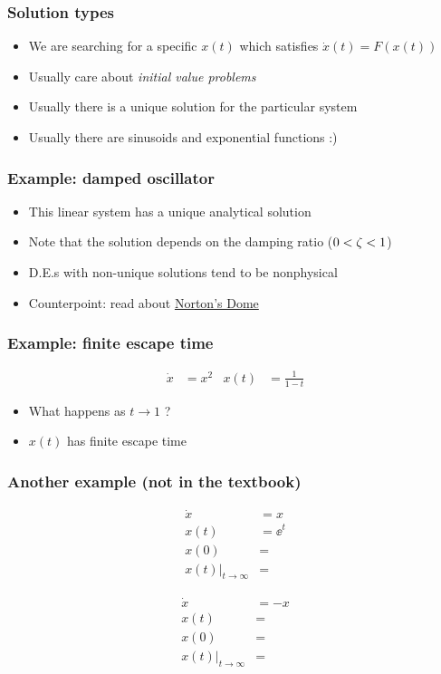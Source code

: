 \documentclass{beamer-control}
\begin{document}
\begin{frame}
\frametitle{Solution types}
\begin{itemize}
\item We are searching for a specific $x(t)$ which satisfies $\dot x(t)=F(x(t))$
\item Usually care about \emph{initial value problems}
\item Usually there is a unique solution for the particular system
\item Usually there are sinusoids and exponential functions :)
\end{itemize}
\end{frame}

\begin{frame}
\frametitle{Example: damped oscillator}
\begin{itemize}
\item This linear system has a unique analytical solution
\item Note that the solution depends on the damping ratio ($0<\zeta<1$)
\item D.E.s with non-unique solutions tend to be nonphysical
\item Counterpoint: read about \href{https://en.wikipedia.org/wiki/Norton\%27s_dome}{Norton's Dome}
\end{itemize}
\end{frame}

\begin{frame}
\frametitle{Example: finite escape time}
\begin{align}
\dot x &= x^2 & x(t) &= \frac{1}{1-t}
\end{align}
\begin{itemize}
\item What happens as $t\to1$ ?
\item $x(t)$ has finite escape time
\end{itemize}
\end{frame}

\begin{frame}
\frametitle{Another example (not in the textbook)}
\begin{align}
\dot x &= x \\
x(t)   &= \ee^{t} \\
x(0)   &= \\
x(t)|_{t\to\infty}&=
\end{align}

\vfill
\hrulefill
\vfill

\begin{align}
\dot x &= -x \\
x(t)   &=  \\
x(0)   &= \\
x(t)|_{t\to\infty}&=
\end{align}
\end{frame}


\SUMMARYFRAME
\FINALE
\end{document}
